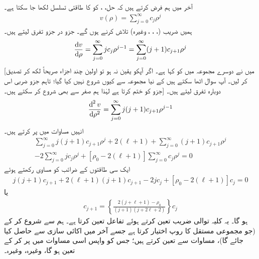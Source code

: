  آخر میں ہم فرض کرتے ہیں کہ حل، ، کو  کا طاقتی تسلسل لکھا جا سکتا ہے۔
 \begin{align}
v(\rho)=\sum_{j=0}^{\infty}c_{j}\rho^{j} 
\end{align}
ہمیں  ضریب  (، ، ، وغیرہ) تلاش کرنے ہوں گے۔ جزو در جزو تفرق لیتے ہیں۔
\begin{align*}
\frac{\dif{v}}{\dif{\rho}}=\sum_{j=0}^{\infty}jc_{j}\rho^{j-1}=\sum_{j=0}^{\infty}(j+1)c_{j+1}\rho^{j} 
\end{align*}
[میں نے دوسرے مجموعہ میں   کو  کہا ہے۔ اگر آپکو یقین نہ ہو تو اولین چند اجزاء صریحاً لکھ کر تصدیق کر لیں۔ آپ سوال اٹھا سکتے ہیں کے نیا مجموعہ  سے کیوں شروع نہیں کیا گیا؛ تاہم جزو ضربی  اس جزو کو ختم کرتا ہے لہٰذا ہم صفر سے بھی شروع کر سکتے ہیں۔] دوبارہ تفرق لیتے ہیں۔
\begin{align*}
\frac{\dif^{\,2}{v}}{\dif{\rho^{2}}}=\sum_{j=0}^{\infty}j(j+1)c_{j+1}\rho^{j-1} 
\end{align*}
انہیں مساوات  میں پر کرتے ہیں۔
\begin{multline*}
\sum_{j=0}^{\infty}j(j+1)c_{j+1}\rho^{j}+2(\ell+1)+\sum_{j=0}^{\infty}(j+1)c_{j+1}\rho^{j} \\
-2\sum_{j=0}^{\infty}jc_{j}\rho^{j}+[\rho_{0}-2(\ell+1)]\sum_{j=0}^{\infty}c_{j}\rho^{j}=0 
\end{multline*}
ایک سی  طاقتوں کے ضرائب کو مساوی رکھتے ہوئے
\begin{align*}
j(j+1)c_{j+1}+2(\ell+1)(j+1)c_{j+1}-2jc_{j}+[\rho_{0}-2(\ell+1)]c_{j}=0 
\end{align*}
یا
\begin{align}\label{مساوات_ابعادی_کولمب_کلیہ_توالی}
c_{j+1}=\left\{\frac{2(j+\ell+1)-\rho_{0}}{(j+1)(j+2\ell+2)}\right\}c_{j} 
\end{align}
ہو گا۔ یہ کلیہ توالی  ضریب  تعین کرتے ہوئے تفاعل  تعین کرتا ہے۔ ہم  سے شروع کر کے (جو مجموعی مستقل کا روپ اختیار کرتا ہے جسے آخر میں اکائی سازی سے حاصل کیا جائے گا)، مساوات  سے  تعین کرتے ہیں؛ جس کو واپس اسی مساوات میں پر کر کے  تعین ہو گا، وغیرہ، وغیرہ۔

